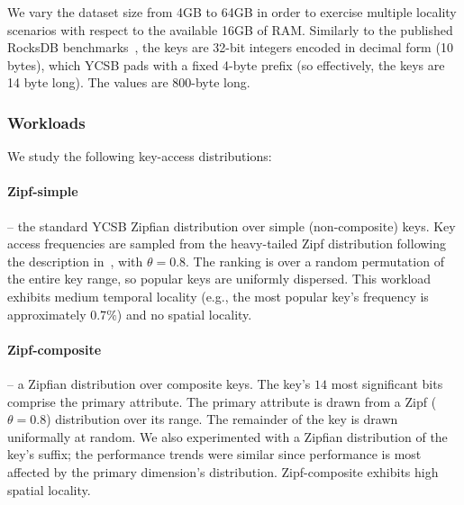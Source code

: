 We vary the dataset size from 4GB to 64GB in order to exercise multiple locality 
scenarios with respect to the available 16GB of RAM. Similarly to the published RocksDB benchmarks~\cite{RocksDBPerf}, 
the keys are 32-bit integers encoded in decimal form (10 bytes), which YCSB pads with a fixed 4-byte prefix (so effectively, 
the keys are 14 byte long). The values are 800-byte long. 



\subsubsection{Workloads}


We study the following key-access distributions:  

\paragraph{Zipf-simple} -- the standard YCSB Zipfian distribution over simple (non-composite) keys. 
Key access frequencies are sampled from the heavy-tailed Zipf distribution 
following the description in~\cite{Gray:1994:QGB:191839.191886}, with $\theta = 0.8$. 
The ranking is over a random permutation of the entire key range, so popular keys are uniformly dispersed.
This workload exhibits medium temporal locality (e.g., the most popular key's frequency is approximately $0.7\%$)
and no spatial locality. 

\paragraph{Zipf-composite} -- a Zipfian distribution over composite keys. 
The key's $14$ most significant bits comprise the primary attribute. 
The primary attribute is drawn from a Zipf ($\theta=0.8$) distribution over its range. The remainder of the key is drawn uniformally at random.
We also experimented with a Zipfian distribution of the key's suffix; 
the performance trends were similar since performance is most affected by 
 the primary dimension's distribution. Zipf-composite exhibits high spatial locality.%

